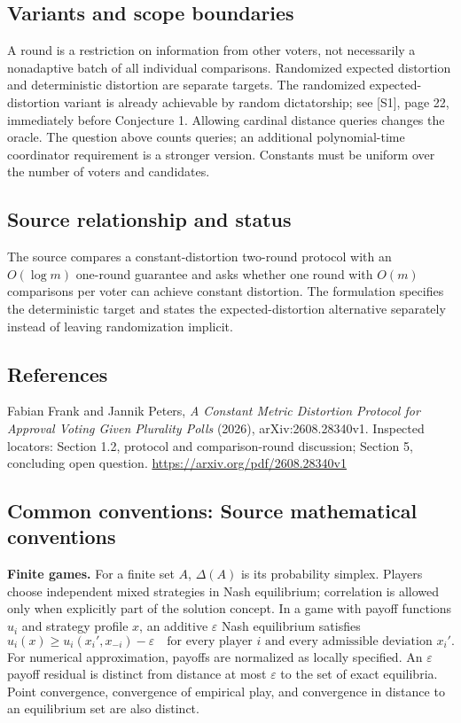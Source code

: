 \documentclass[11pt,a4paper]{article}
\begin{document}
\subsection*{Variants and scope boundaries}
A round is a restriction on information from other voters, not necessarily a nonadaptive batch of all individual comparisons. Randomized expected distortion and deterministic distortion are separate targets. The randomized expected-distortion variant is already achievable by random dictatorship; see [S1], page 22, immediately before Conjecture 1. Allowing cardinal distance queries changes the oracle. The question above counts queries; an additional polynomial-time coordinator requirement is a stronger version. Constants must be uniform over the number of voters and candidates.

\subsection*{Source relationship and status}
The source compares a constant-distortion two-round protocol with an $O(\log m)$ one-round guarantee and asks whether one round with $O(m)$ comparisons per voter can achieve constant distortion. The formulation specifies the deterministic target and states the expected-distortion alternative separately instead of leaving randomization implicit.

\subsection*{References}
\begingroup\footnotesize\raggedright
\noindent [S1] Fabian Frank and Jannik Peters, \emph{A Constant Metric Distortion Protocol for Approval Voting Given Plurality Polls} (2026), arXiv:2608.28340v1. Inspected locators: Section 1.2, protocol and comparison-round discussion; Section 5, concluding open question.
\url{https://arxiv.org/pdf/2608.28340v1}
\par\endgroup

\subsection*{Common conventions: Source mathematical conventions}

\textbf{Finite games.} For a finite set $A$, $\Delta(A)$ is its probability
simplex. Players choose independent mixed strategies in Nash equilibrium;
correlation is allowed only when explicitly part of the solution concept.
In a game with payoff functions $u_i$ and strategy profile $x$, an additive
$\varepsilon$ Nash equilibrium satisfies
\[
 u_i(x)\geq u_i(x_i',x_{-i})-\varepsilon
 \quad\text{for every player $i$ and every admissible deviation $x_i'$}.
\]
For numerical approximation, payoffs are normalized as locally specified.
An $\varepsilon$ payoff residual is distinct from distance at most
$\varepsilon$ to the set of exact equilibria. Point convergence, convergence
of empirical play, and convergence in distance to an equilibrium set are
also distinct.
\end{document}
